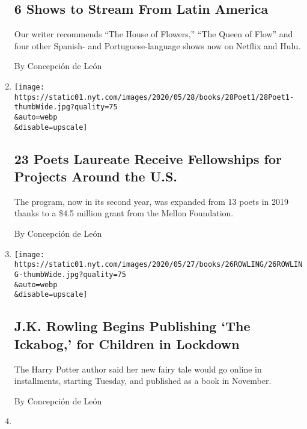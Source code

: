 \begin{enumerate}
  \hypertarget{6-shows-to-stream-from-latin-america}{%
  \subsection{6 Shows to Stream From Latin
  America}\label{6-shows-to-stream-from-latin-america}}

  Our writer recommends ``The House of Flowers,'' ``The Queen of Flow''
  and four other Spanish- and Portuguese-language shows now on Netflix
  and Hulu.

  By Concepción de León
\item
  \href{/2020/05/28/books/poets-laureate-fellowships.html}{}

  \texttt{[image: https://static01.nyt.com/images/2020/05/28/books/28Poet1/28Poet1-thumbWide.jpg?quality=75\\\&auto=webp\\\&disable=upscale]}

  \hypertarget{23-poets-laureate-receive-fellowships-for-projects-around-the-us}{%
  \subsection{23 Poets Laureate Receive Fellowships for Projects Around
  the
  U.S.}\label{23-poets-laureate-receive-fellowships-for-projects-around-the-us}}

  The program, now in its second year, was expanded from 13 poets in
  2019 thanks to a \$4.5 million grant from the Mellon Foundation.

  By Concepción de León
\item
  \href{/2020/05/26/books/jk-rowling-ickabog-coronavirus.html}{}

  \texttt{[image: https://static01.nyt.com/images/2020/05/27/books/26ROWLING/26ROWLING-thumbWide.jpg?quality=75\\\&auto=webp\\\&disable=upscale]}

  \hypertarget{jk-rowling-begins-publishing-the-ickabog-for-children-in-lockdown}{%
  \subsection{J.K. Rowling Begins Publishing `The Ickabog,' for Children
  in
  Lockdown}\label{jk-rowling-begins-publishing-the-ickabog-for-children-in-lockdown}}

  The Harry Potter author said her new fairy tale would go online in
  installments, starting Tuesday, and published as a book in November.

  By Concepción de León
\item
  \href{/2020/05/21/books/bill-clinton-james-patterson-presidents-daughter.html}{}


\end{enumerate}
